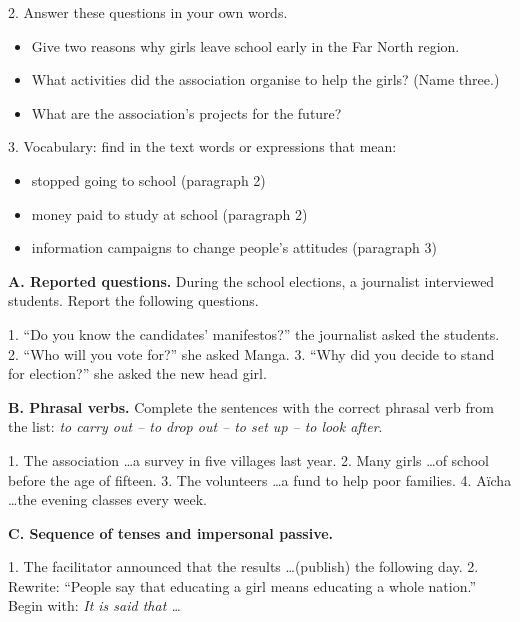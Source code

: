 \documentclass[11pt]{article}
\begin{document}
\begin{exercice}
2. Answer these questions in your own words.
\begin{itemize}
\item[a.] Give two reasons why girls leave school early in the Far North region.
\item[b.] What activities did the association organise to help the girls? (Name three.)
\item[c.] What are the association's projects for the future?
\end{itemize}

3. Vocabulary: find in the text words or expressions that mean:
\begin{itemize}
\item[a.] stopped going to school (paragraph 2)
\item[b.] money paid to study at school (paragraph 2)
\item[c.] information campaigns to change people's attitudes (paragraph 3)
\end{itemize}
\end{exercice}

\begin{exercice}
\textbf{A. Reported questions.} During the school elections, a journalist interviewed students. Report the following questions.

1. ``Do you know the candidates' manifestos?'' the journalist asked the students.
2. ``Who will you vote for?'' she asked Manga.
3. ``Why did you decide to stand for election?'' she asked the new head girl.

\textbf{B. Phrasal verbs.} Complete the sentences with the correct phrasal verb from the list: \emph{to carry out -- to drop out -- to set up -- to look after}.

1. The association \ldots a survey in five villages last year.
2. Many girls \ldots of school before the age of fifteen.
3. The volunteers \ldots a fund to help poor families.
4. Aïcha \ldots the evening classes every week.

\textbf{C. Sequence of tenses and impersonal passive.}

1. The facilitator announced that the results \ldots (publish) the following day.
2. Rewrite: ``People say that educating a girl means educating a whole nation.'' Begin with: \emph{It is said that \ldots}
\end{exercice}
\end{document}
